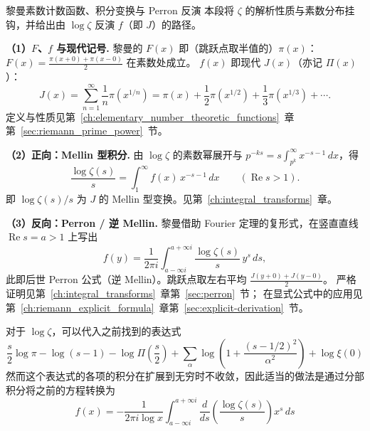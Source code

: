 \clearpage
\begin{commentary}{黎曼素数计数函数、积分变换与 Perron 反演}
本段将 $\zeta$ 的解析性质与素数分布挂钩，并给出由 $\log\zeta$ 反演 $f$（即 $J$）的路径。

\textbf{（1）$F$、$f$ 与现代记号.}
黎曼的 $F(x)$ 即（跳跃点取半值的）$\pi(x)$：
$ F(x)=\frac{\pi(x+0)+\pi(x-0)}{2}$ 在素数处成立。
$f(x)$ 即现代 $J(x)$（亦记 $\Pi(x)$）：
\[
J(x)=\sum_{n=1}^\infty\frac1n\pi(x^{1/n})
=\pi(x)+\frac12\pi(x^{1/2})+\frac13\pi(x^{1/3})+\cdots.
\]
定义与性质见第~\ref{ch:elementary_number_theoretic_functions}~章第~\ref{sec:riemann_prime_power}~节。

\textbf{（2）正向：Mellin 型积分.}
由 $\log\zeta$ 的素数幂展开与 $p^{-ks}=s\int_{p^k}^\infty x^{-s-1}\,dx$，得
\[
\frac{\log\zeta(s)}{s}=\int_1^\infty f(x)\,x^{-s-1}\,dx
\qquad(\operatorname{Re}s>1).
\]
即 $\log\zeta(s)/s$ 为 $J$ 的 Mellin 型变换。见第~\ref{ch:integral_transforms}~章。

\textbf{（3）反向：Perron / 逆 Mellin.}
黎曼借助 Fourier 定理的复形式，在竖直直线 $\operatorname{Re}s=a>1$ 上写出
\[
f(y)=\frac{1}{2\pi i}\int_{a-\infty i}^{a+\infty i}\frac{\log\zeta(s)}{s}\,y^s\,ds,
\]
此即后世 Perron 公式（逆 Mellin）。跳跃点取左右平均
$\frac{J(y+0)+J(y-0)}{2}$。
严格证明见第~\ref{ch:integral_transforms}~章第~\ref{sec:perron}~节；
在显式公式中的应用见第~\ref{ch:riemann_explicit_formula}~章第~\ref{sec:explicit-derivation}~节。
\end{commentary}

对于 $\log \zeta$，可以代入之前找到的表达式
\[
\frac{s}{2}\log \pi - \log(s-1) - \log\Pi\left(\frac{s}{2}\right) + \sum_{\alpha} \log\left(1 + \frac{(s-1/2)^2}{\alpha^2}\right) + \log\xi(0)
\]
然而这个表达式的各项的积分在扩展到无穷时不收敛，因此适当的做法是通过分部积分将之前的方程转换为
\[
f(x) = -\frac{1}{2\pi i \log x} \int_{a-\infty i}^{a+\infty i} \frac{d}{ds} \left(\frac{\log \zeta(s)}{s}\right) x^s \, ds
\]

